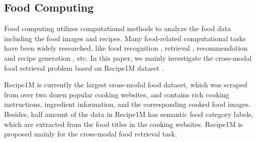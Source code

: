 \documentclass[journal]{IEEEtran}
\begin{document}
\subsection{Food Computing}
Food computing \cite{min2018survey} utilizes computational methods to analyze the food data including the food images and recipes. Many food-related computational tasks have been widely researched, like food recognition \cite{min2017you, horiguchi2018personalized,jiang2019multi,min2020isia}, retrieval \cite{min2016being, salvador2017learning}, recommendation \cite{ge2015using,min2019food} and recipe generation \cite{wang2020structure}, etc. In this paper, we mainly investigate the cross-modal food retrieval problem based on Recipe1M dataset \cite{salvador2017learning}.

Recipe1M \cite{salvador2017learning} is currently the largest cross-modal food dataset, which was scraped from over two dozen popular cooking websites, and contains rich cooking instructions, ingredient information, and the corresponding cooked food images. Besides, half amount of the data in Recipe1M has semantic food category labels, which are extracted from the food titles in the cooking websites. Recipe1M is proposed mainly for the cross-modal food retrieval task. 
\end{document}
